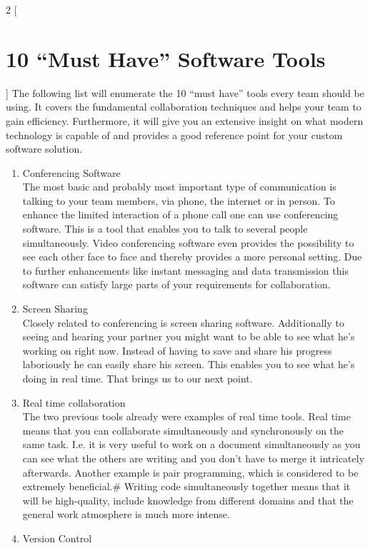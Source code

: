 \begin{multicols}{2}
[\section{10 “Must Have” Software Tools}]
The following list will enumerate the 10 “must have” tools every team should be using. It covers the fundamental collaboration techniques and helps your team to gain efficiency. Furthermore, it will give you an extensive insight on what modern technology is capable of and provides a good reference point for your custom software solution.
\begin{enumerate}[1.]
  \item Conferencing Software\\
The most basic and probably most important type of communication is talking to your team members, via phone, the internet or in person. To enhance the limited interaction of a phone call one can use conferencing software. This is a tool that enables you to talk to several people simultaneously. Video conferencing software even provides the possibility to see each other face to face and thereby provides a more personal setting. Due to further enhancements like instant messaging and data transmission this software can satisfy large parts of your requirements for collaboration.
  \item Screen Sharing\\
Closely related to conferencing is screen sharing software. Additionally to seeing and hearing your partner you might want to be able to see what he’s working on right now. Instead of having to save and share his progress laboriously he can easily share his screen. This enables you to see what he’s doing in real time. That brings us to our next point.
	\item Real time collaboration\\
The two previous tools already were examples of real time tools. Real time means that you can collaborate simultaneously and synchronously on the same task. I.e. it is very useful to work on a document simultaneously as you can see what the others are writing and you don’t have to merge it intricately afterwards. Another example is pair programming, which is considered to be extremely beneficial.# Writing code simultaneously together means that it will be high-quality, include knowledge from different domains and that the general work atmosphere is much more intense.
	\item Version Control\\

\end{enumerate}
\end{multicols}
